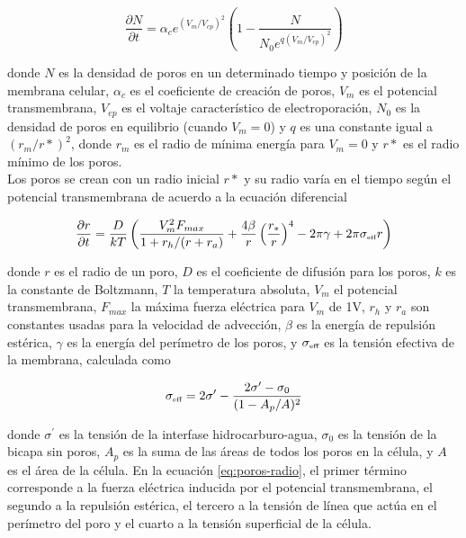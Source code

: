 \documentclass[a4paper,10pt]{article}
\begin{document}
\begin{equation} \label{eq:poros-crea}
	\frac{\partial N}{\partial t} = \alpha_c e^{(V_m/V_{ep})^2} \left( 1 - \frac{N}{N_0 e^{q \left(V_m/V_{ep} \right) ^2}} \right)
\end{equation}

donde $N$ es la densidad de poros en un determinado tiempo y posición de la membrana celular, $\alpha_c$ es el coeficiente de creación de poros, $V_m$ es el potencial transmembrana, $V_{ep}$ es el voltaje característico de electroporación, $N_0$ es la densidad de poros en equilibrio (cuando $V_m = 0$) y $q$ es una constante igual a $(r_m / r*)^2$, donde $r_m$ es el radio de mínima energía para $V_m = 0$ y $r*$ es el radio mínimo de los poros.\\

Los poros se crean con un radio inicial $r*$ y su radio varía en el tiempo según el potencial transmembrana de acuerdo a la ecuación diferencial

\begin{equation} \label{eq:poros-radio}
	\frac{\partial r}{\partial t} = \frac{D}{kT} \left( \frac{V_m^2 F_{max}}{1+r_h / (r+r_a)} + \frac{4 \beta}{r} \left(\frac{r_*}{r}\right)^4 - 2 \pi \gamma + 2 \pi \sigma_{\textrm{\tiny eff}} r\right)
\end{equation}

donde $r$ es el radio de un poro, $D$ es el coeficiente de difusión para los poros, $k$ es la constante de Boltzmann, $T$ la temperatura absoluta, $V_m$ el potencial transmembrana, $F_{max}$ la máxima fuerza eléctrica para $V_m$ de 1V, $r_h$ y $r_a$ son constantes usadas para la velocidad de advección, $\beta$ es la energía de repulsión estérica, $\gamma$ es la energía del perímetro de los poros, y $\sigma_{\textrm{\tiny eff}}$ es la tensión efectiva de la membrana, calculada como

\begin{equation}
	\sigma_{\textrm{\tiny eff}} = 2 \sigma^\prime - \frac{2 \sigma^\prime - \sigma_0}{(1 - A_p / A)^2}
\end{equation}

donde $\sigma^\prime$ es la tensión de la interfase hidrocarburo-agua, $\sigma_0$ es la tensión de la bicapa sin poros, $A_p$ es la suma de las áreas de todos los poros en la célula, y $A$ es el área de la célula. En la ecuación \ref{eq:poros-radio}, el primer término corresponde a la fuerza eléctrica inducida por el potencial transmembrana, el segundo a la repulsión estérica, el tercero a la tensión de línea que actúa en el perímetro del poro y el cuarto a la tensión superficial de la célula.\\
\end{document}
